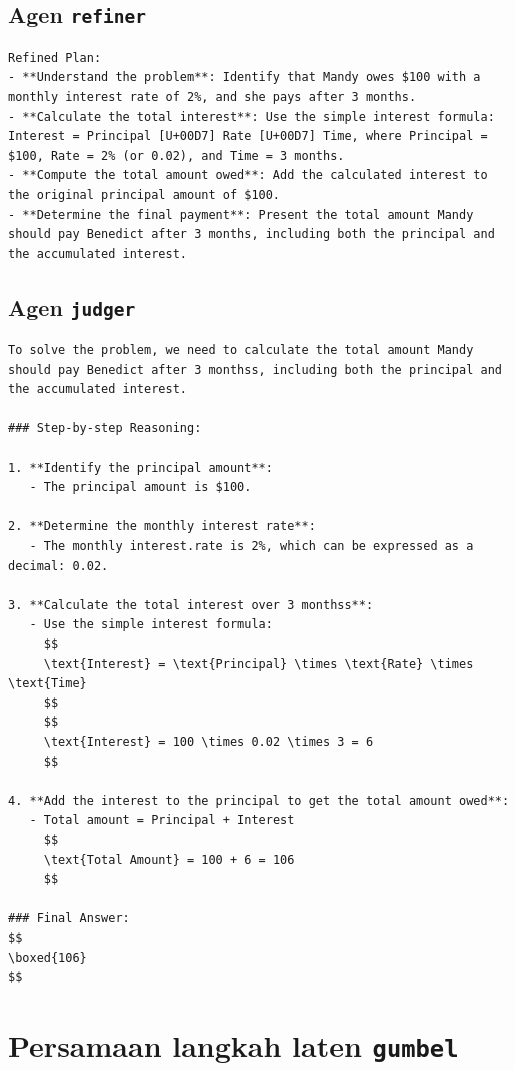 \subsection*{Agen \texttt{refiner}}
\begin{lstlisting}[basicstyle=\ttfamily\scriptsize,breaklines=true,frame=single]
Refined Plan:  
- **Understand the problem**: Identify that Mandy owes $100 with a monthly interest rate of 2%, and she pays after 3 months.  
- **Calculate the total interest**: Use the simple interest formula: Interest = Principal [U+00D7] Rate [U+00D7] Time, where Principal = $100, Rate = 2% (or 0.02), and Time = 3 months.  
- **Compute the total amount owed**: Add the calculated interest to the original principal amount of $100.  
- **Determine the final payment**: Present the total amount Mandy should pay Benedict after 3 months, including both the principal and the accumulated interest.
\end{lstlisting}

\subsection*{Agen \texttt{judger}}
\begin{lstlisting}[basicstyle=\ttfamily\scriptsize,breaklines=true,frame=single]
To solve the problem, we need to calculate the total amount Mandy should pay Benedict after 3 monthss, including both the principal and the accumulated interest.

### Step-by-step Reasoning:

1. **Identify the principal amount**:  
   - The principal amount is $100.

2. **Determine the monthly interest rate**:  
   - The monthly interest.rate is 2%, which can be expressed as a decimal: 0.02.

3. **Calculate the total interest over 3 monthss**:  
   - Use the simple interest formula:  
     $$
     \text{Interest} = \text{Principal} \times \text{Rate} \times \text{Time}
     $$
     $$
     \text{Interest} = 100 \times 0.02 \times 3 = 6
     $$

4. **Add the interest to the principal to get the total amount owed**:  
   - Total amount = Principal + Interest  
     $$
     \text{Total Amount} = 100 + 6 = 106
     $$

### Final Answer:
$$
\boxed{106}
$$
\end{lstlisting}

\section*{Persamaan langkah laten \texttt{gumbel}}

